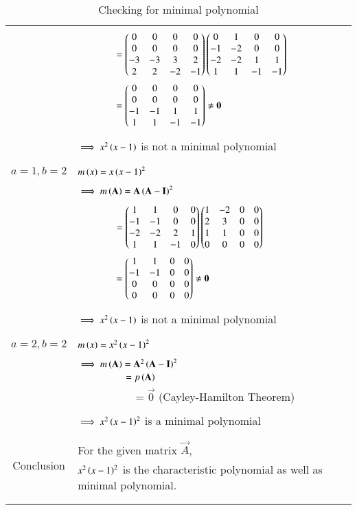 \begin{longtable}{|c|l|}
	&\\
	& $\qquad \qquad=\begin{pmatrix}0&0&0&0\\0&0&0&0\\-3&-3&3&2\\2&2&-2&-1\end{pmatrix}\begin{pmatrix}0&1&0&0\\-1&-2&0&0\\-2&-2&1&1\\1&1&-1&-1\end{pmatrix}$\\
	& $\qquad \qquad = \myvec{0&0&0&0\\0&0&0&0\\-1&-1&1&1\\1&1&-1&-1}\neq\Vec{0}$\\
	&\\
	&$\implies x^2\left(x-1\right)$ is not a minimal polynomial\\
	&\\
	\hline
	\multirow{3}{*}{$a=1,b=2$} & \\
	&$m\left(x\right)=x\left(x-1\right)^2$\\
	&\\
	& $\implies m\brak{\vec{A}}=\vec{A}\brak{\Vec{A}-\vec{I}}^2$\\
	&\\
	& $\qquad\qquad=\begin{pmatrix}1&1&0&0\\-1&-1&0&0\\-2&-2&2&1\\1&1&-1&0\end{pmatrix}\begin{pmatrix}1&-2&0&0\\2&3&0&0\\1&1&0&0\\0&0&0&0\end{pmatrix}$\\
	& $\qquad\qquad = \myvec{1&1&0&0\\-1&-1&0&0\\0&0&0&0\\0&0&0&0}\neq\Vec{0}$\\
	&\\
	&$\implies x^2\left(x-1\right)$ is not a minimal polynomial\\
	&\\
	\hline
	\multirow{3}{*}{$a=2,b=2$} & \\
	&$m\left(x\right)=x^2\left(x-1\right)^2$\\
	&\\
	&$\implies m\brak{\vec{A}}=\vec{A}^2\brak{\Vec{A}-\vec{I}}^2$\\
	& $\qquad \qquad \quad=p\brak{\Vec{A}}$\\
	&$\qquad\qquad\quad=\vec{0}$ (Cayley-Hamilton Theorem)\\
	&\\
	&$\implies x^2\left(x-1\right)^2$ is a minimal polynomial\\
	&\\
	\hline
	\multirow{3}{*}{Conclusion} & \\
	& For the given matrix $\Vec{A}$,\\
	&$x^2\left(x-1\right)^2$ is the characteristic polynomial as well as minimal polynomial.\\
	&\\
	\hline
	\caption{Checking for minimal polynomial}
    \label{eq:solutions/6/3/3/table:2}
\end{longtable}
